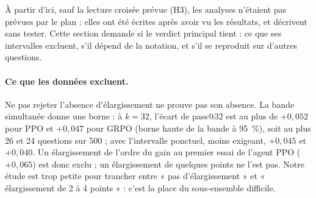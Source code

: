 À partir d'ici, sauf la lecture croisée prévue (H3), les analyses n'étaient pas prévues par le plan : elles ont été écrites après avoir vu les résultats, et décrivent sans tester. Cette section demande si le verdict principal tient : ce que ses intervalles excluent, s'il dépend de la notation, et s'il se reproduit sur d'autres questions.

\paragraph{Ce que les données excluent.} Ne pas rejeter l'absence d'élargissement ne prouve pas son absence. La bande simultanée donne une borne : à $k = 32$, l'écart de pass@32 est au plus de $+0{,}052$ pour PPO et $+0{,}047$ pour GRPO (borne haute de la bande à 95~\%), soit au plus 26 et 24 questions sur 500 ; avec l'intervalle ponctuel, moins exigeant, $+0{,}045$ et $+0{,}040$. Un élargissement de l'ordre du gain au premier essai de l'agent PPO ($+0{,}065$) est donc exclu ; un élargissement de quelques points ne l'est pas. Notre étude est trop petite pour trancher entre « pas d'élargissement » et « élargissement de 2 à 4 points » : c'est la place du sous-ensemble difficile.

